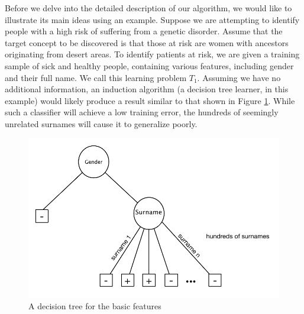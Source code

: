 \documentclass[twoside,11pt]{article}
\theoremstyle{definition}
\begin{document}
Before we delve into the detailed description of our algorithm, we would like to illustrate its main ideas using an example.
Suppose we are attempting to identify people with a high risk of suffering from a genetic disorder. Assume that the target concept to be discovered is that those at risk are women with ancestors originating from desert areas. To identify patients at risk, we are given a training sample of sick and healthy people, containing various features, including gender and their full name. We call this learning problem $T_1$.
Assuming we have no additional information, an induction algorithm (a decision tree learner, in this example) would likely produce a result similar to that shown in Figure \ref{fig:tree_base}. While such a classifier will achieve a low training error, the hundreds of seemingly unrelated surnames will cause it to generalize poorly. %

\begin{figure}[h]
	\centering
	\includegraphics[width=0.8\linewidth]{fig1.pdf}
	\caption{A decision tree for the basic features}
	\label{fig:tree_base}
\end{figure}
\end{document}
